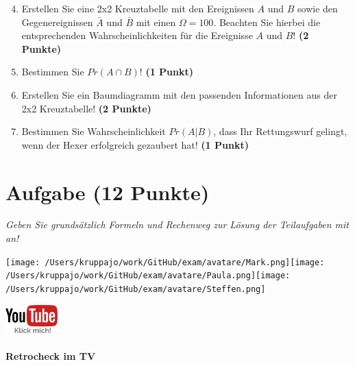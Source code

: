 \documentclass[a4paper, 9pt]{scrartcl}\usepackage[]{graphicx}\usepackage[]{xcolor}
\begin{document}
\begin{enumerate}
  \setcounter{enumi}{3}
\item Erstellen Sie eine 2x2 Kreuztabelle mit den Ereignissen $A$ und $B$ sowie den Gegenereignissen $\bar{A}$ und $\bar{B}$ mit einen $\Omega = 100$. Beachten Sie hierbei die entsprechenden Wahrscheinlichkeiten für die Ereignisse $A$ und $B$! \textbf{(2 Punkte)}
\item Bestimmen Sie $Pr(A \cap B)$! \textbf{(1 Punkt)}
\item Erstellen Sie ein Baumdiagramm mit den passenden Informationen aus der 2x2 Kreuztabelle! \textbf{(2 Punkte)}
\item Bestimmen Sie Wahrscheinlichkeit $Pr(A|B)$, dass Ihr Rettungswurf gelingt, wenn der Hexer erfolgreich gezaubert hat! \textbf{(1 Punkt)}
\end{enumerate}

  
\clearpage

\section{Aufgabe \hfill (12 Punkte)}

\textit{Geben Sie grundsätzlich Formeln und Rechenweg zur Lösung der Teilaufgaben mit an!} \\[1Ex]
 

 
\begin{minipage}[t]{0.5\textwidth}
\texttt{[image: /Users/kruppajo/work/GitHub/exam/avatare/Mark.png]}\hspace{-4mm}\texttt{[image: /Users/kruppajo/work/GitHub/exam/avatare/Paula.png]}\hspace{-4mm}\texttt{[image: /Users/kruppajo/work/GitHub/exam/avatare/Steffen.png]}
\end{minipage}
\begin{minipage}[t]{0.5\textwidth}
\hfill
\href{https://youtu.be/8Pb2sKUIMyk}{\includegraphics[width = 2cm]{img/youtube}}
\end{minipage}




\paragraph{Retrocheck im TV}
\end{document}
